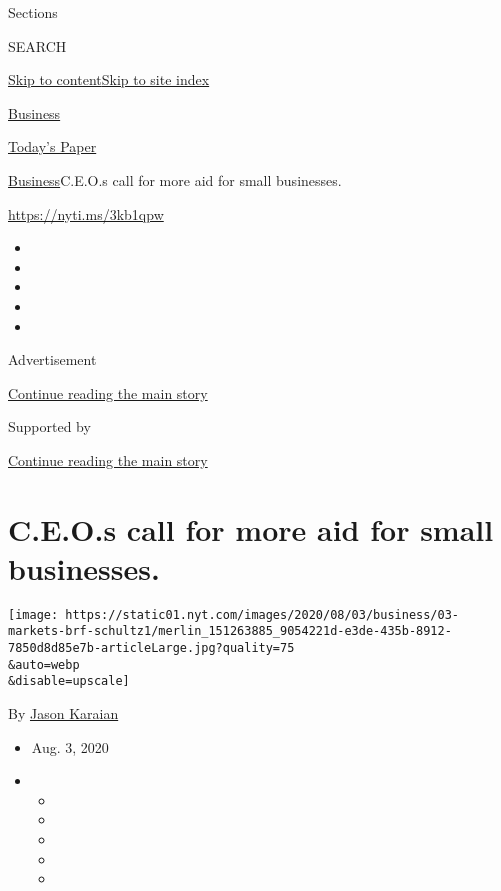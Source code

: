 Sections

SEARCH

\protect\hyperlink{site-content}{Skip to
content}\protect\hyperlink{site-index}{Skip to site index}

\href{https://www.nytimes.com/section/business}{Business}

\href{https://myaccount.nytimes.com/auth/login?response_type=cookie\&client_id=vi}{}

\href{https://www.nytimes.com/section/todayspaper}{Today's Paper}

\href{/section/business}{Business}\textbar{}C.E.O.s call for more aid
for small businesses.

\url{https://nyti.ms/3kb1qpw}

\begin{itemize}
\item
\item
\item
\item
\item
\end{itemize}

Advertisement

\protect\hyperlink{after-top}{Continue reading the main story}

Supported by

\protect\hyperlink{after-sponsor}{Continue reading the main story}

\hypertarget{ceos-call-for-more-aid-for-small-businesses}{%
\section{C.E.O.s call for more aid for small
businesses.}\label{ceos-call-for-more-aid-for-small-businesses}}

\texttt{[image: https://static01.nyt.com/images/2020/08/03/business/03-markets-brf-schultz1/merlin\_151263885\_9054221d-e3de-435b-8912-7850d8d85e7b-articleLarge.jpg?quality=75\\\&auto=webp\\\&disable=upscale]}

By \href{https://www.nytimes.com/by/jason-karaian}{Jason Karaian}

\begin{itemize}
\item
  Aug. 3, 2020
\item
  \begin{itemize}
  \item
  \item
  \item
  \item
  \item
  \end{itemize}
\end{itemize}

